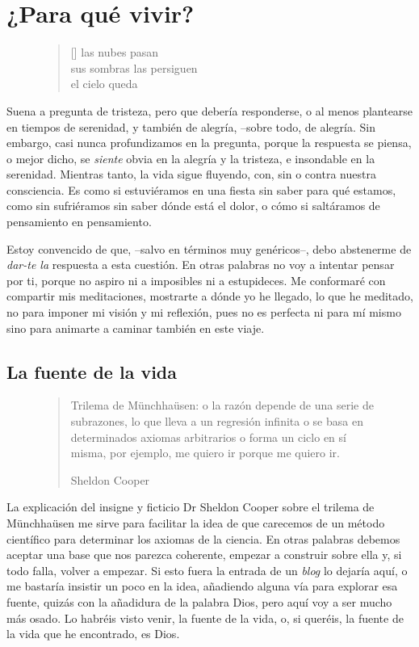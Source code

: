 \chapter{¿Para qué vivir?}

\begin{figure}
\settowidth{\versewidth}{sus sombras las persiguen }
\begin{verse}[\versewidth]
\vin las nubes pasan \\
sus sombras las persiguen \\
\vin el cielo queda
\end{verse}
\end{figure}

Suena a pregunta de tristeza, pero que debería responderse, o al menos plantearse en tiempos de serenidad, y también de alegría, --sobre todo, de alegría. Sin embargo, casi nunca profundizamos en la pregunta, porque la respuesta se piensa, o mejor dicho, se \emph{siente} obvia en la alegría y la tristeza, e insondable en la serenidad. Mientras tanto, la vida sigue fluyendo, con, sin o contra nuestra consciencia. Es como si estuviéramos en una fiesta sin saber para qué estamos, como sin sufriéramos sin saber dónde está el dolor, o cómo si saltáramos de pensamiento en pensamiento.

Estoy convencido de que, --salvo en términos muy genéricos--, debo abstenerme de \emph{dar-te la} respuesta a esta cuestión. En otras palabras no voy a intentar pensar por ti, porque no aspiro ni a imposibles ni a estupideces. Me conformaré con compartir mis meditaciones, mostrarte a dónde yo he llegado, lo que he meditado, no para imponer mi visión y mi reflexión, pues no es perfecta ni para mí mismo sino para animarte a caminar también en este viaje.

\section{La fuente de la vida}

\begin{figure}
\blockquote[Sheldon Cooper]{
Trilema de Münchhaüsen: o la razón depende de una serie de subrazones, lo que lleva a un regresión infinita o se basa en determinados axiomas arbitrarios o forma un ciclo en sí misma, por ejemplo, me quiero ir porque me quiero ir.}
\end{figure}

La explicación del insigne y ficticio Dr Sheldon Cooper sobre el trilema de Münchhaüsen me sirve para facilitar la idea de que carecemos de un método científico para determinar los axiomas de la ciencia. En otras palabras debemos aceptar una base que nos parezca coherente, empezar a construir sobre ella y, si todo falla, volver a empezar. Si esto fuera la entrada de un \emph{blog} lo dejaría aquí, o me bastaría insistir un poco en la idea, añadiendo alguna vía para explorar esa fuente, quizás con la añadidura de la palabra Dios, pero aquí voy a ser mucho más osado. Lo habréis visto venir, la fuente de la vida, o, si queréis, la fuente de la vida que he encontrado, es Dios.

